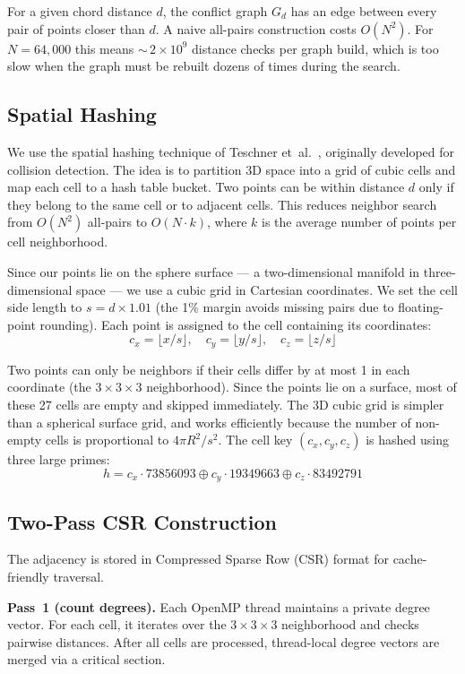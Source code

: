 \documentclass[11pt,a4paper]{article}
\begin{document}
For a given chord distance $d$, the conflict graph $G_d$ has an edge between every pair
of points closer than $d$. A naive all-pairs construction costs $O(N^2)$. For
$N = 64{,}000$ this means ${\sim}\, 2 \times 10^9$ distance checks per graph build,
which is too slow when the graph must be rebuilt dozens of times during the search.

\subsection{Spatial Hashing}

We use the spatial hashing technique of Teschner et~al.\ \cite{teschner2003},
originally developed for collision detection. The idea is to partition 3D space
into a grid of cubic cells and map each cell to a hash table bucket. Two points
can be within distance $d$ only if they belong to the same cell or to adjacent
cells. This reduces neighbor search from $O(N^2)$ all-pairs to $O(N \cdot k)$,
where $k$ is the average number of points per cell neighborhood.

Since our points lie on the sphere surface --- a two-dimensional manifold in
three-dimensional space --- we use a cubic grid in Cartesian coordinates.
We set the cell side length to $s = d \times 1.01$ (the 1\% margin avoids
missing pairs due to floating-point rounding). Each point is assigned to the
cell containing its coordinates:
\[
  c_x = \lfloor x / s \rfloor, \quad
  c_y = \lfloor y / s \rfloor, \quad
  c_z = \lfloor z / s \rfloor
\]

Two points can only be neighbors if their cells differ by at most 1 in each
coordinate (the $3 \times 3 \times 3$ neighborhood). Since the points lie on a
surface, most of these 27 cells are empty and skipped immediately. The 3D cubic
grid is simpler than a spherical surface grid, and works efficiently because the
number of non-empty cells is proportional to $4\pi R^2 / s^2$.
The cell key $(c_x, c_y, c_z)$ is hashed using three large primes:
\[
  h = c_x \cdot 73856093 \oplus c_y \cdot 19349663 \oplus c_z \cdot 83492791
\]

\subsection{Two-Pass CSR Construction}

The adjacency is stored in Compressed Sparse Row (CSR) format for cache-friendly
traversal.

\textbf{Pass~1 (count degrees).} Each OpenMP thread maintains a private degree vector.
For each cell, it iterates over the $3 \times 3 \times 3$ neighborhood and checks
pairwise distances. After all cells are processed, thread-local degree vectors are merged
via a critical section.
\end{document}
